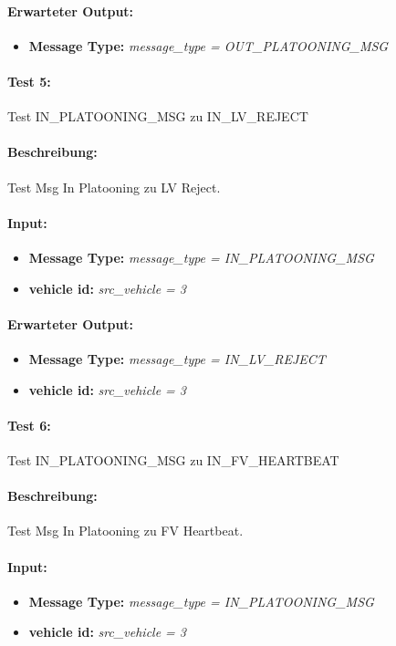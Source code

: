 \documentclass[a4paper, 12pt, titlepage]{scrartcl}
\begin{document}
{\begin{itemize}
			\end{itemize}
			\paragraph{Erwarteter Output:}
			\begin{itemize} \itemsep-0.5em
				\item \textbf{Message Type:} \emph{message\_type = OUT\_PLATOONING\_MSG}
			\end{itemize}	

			\paragraph{Test 5:}{Test IN\_PLATOONING\_MSG zu IN\_LV\_REJECT}
			\paragraph{Beschreibung:} Test Msg In Platooning zu LV Reject.
			\paragraph{Input:}
			\begin{itemize} \itemsep-0.5em
				\item \textbf{Message Type:} \emph{message\_type = IN\_PLATOONING\_MSG}
				\item \textbf{vehicle id:} \emph{src\_vehicle = 3}
			\end{itemize}
			\paragraph{Erwarteter Output:}
			\begin{itemize} \itemsep-0.5em
				\item \textbf{Message Type:} \emph{message\_type = IN\_LV\_REJECT}
				\item \textbf{vehicle id:} \emph{src\_vehicle = 3}
			\end{itemize}
			
			\paragraph{Test 6:}{Test IN\_PLATOONING\_MSG zu IN\_FV\_HEARTBEAT}
			\paragraph{Beschreibung:} Test Msg In Platooning zu FV Heartbeat.
			\paragraph{Input:}
			\begin{itemize} \itemsep-0.5em
				\item \textbf{Message Type:} \emph{message\_type = IN\_PLATOONING\_MSG}
				\item \textbf{vehicle id:} \emph{src\_vehicle = 3}
			\end{itemize}
}
\end{document}
